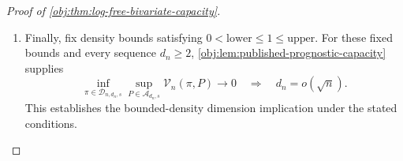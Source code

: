\begin{proof}[Proof of \cref{obj:thm:log-free-bivariate-capacity}]
\begin{enumerate}
Conversely, if \(B_n/n\to0\), then \(a_s(n,d_n)\to0\). The constructed admissible kernel gives, for every \(n\geq2\),
\[
0\leq R_s(n,d_n)
\leq
\sup_{m\in\mathcal H_{d_n,s}}
\mathcal L_{n,d_n,s}(\pi^\star_{n,d_n},m)
\leq3072a_s(n,d_n).
\]
The right-hand side tends to zero, so squeezing gives \(R_s(n,d_n)\to0\). Thus
\[
R_s(n,d_n)\longrightarrow0
\quad\Longleftrightarrow\quad
\frac{\binom{d_n}{2}}n\longrightarrow0
\quad\Longleftrightarrow\quad
d_n=o(\sqrt n).
\]

\item
Finally, fix density bounds satisfying
\(0<\mathrm{lower}\leq1\leq\mathrm{upper}\).
For these fixed bounds and every sequence \(d_n\geq2\),
\cref{obj:lem:published-prognostic-capacity} supplies
\[
\inf_{\pi\in\mathcal D_{n,d_n,s}}
\sup_{P\in\mathcal A_{d_n,s}}\mathcal V_n(\pi,P)
\longrightarrow0
\quad\Longrightarrow\quad
d_n=o(\sqrt n).
\]
This establishes the bounded-density dimension implication under the stated conditions.
\end{enumerate}
\end{proof}


